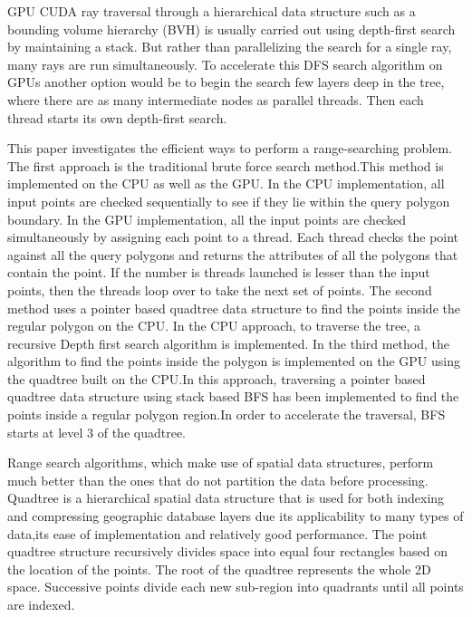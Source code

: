 \documentclass{article}
\begin{document}
GPU CUDA ray traversal through a hierarchical data structure such as a bounding volume hierarchy (BVH) is usually carried out using depth-first search  by maintaining a stack.
But rather than parallelizing the search for a single ray, many rays are run simultaneously.
To accelerate this DFS search algorithm on GPUs another option would be to begin the search few layers deep in the tree, where there are as many intermediate nodes as parallel threads. Then each thread starts its own depth-first search.

This paper investigates the efficient ways to perform a range-searching problem.
The first approach is the traditional brute force search method.This method is implemented on the CPU as well as the GPU. In the CPU implementation, all input points are checked  sequentially to see if they lie within the query polygon boundary. In the GPU implementation, all the input points are checked simultaneously by assigning each point to a thread. Each thread checks the point against all the query polygons and returns the attributes of all the polygons that contain the point. If the number is threads launched is lesser than the input points, then the threads loop over to take the next set of points.
The second method uses a pointer based quadtree data structure to find the points inside the regular polygon on the CPU. In the CPU approach, to traverse the tree, a recursive Depth first search algorithm is implemented.
In the third method, the algorithm to find the points inside the polygon is implemented on the GPU  using the quadtree built on the CPU.In this approach, traversing a pointer based quadtree data structure using stack based BFS has been implemented to find the points inside a regular polygon region.In order to accelerate the traversal, BFS starts at level 3 of the quadtree.

Range search algorithms, which make use of spatial data structures, perform much better than the ones that do not partition the data before processing. Quadtree is a hierarchical spatial data structure that is used for both indexing and compressing geographic database layers due its applicability to many types of data,its ease of implementation and relatively good performance. The point quadtree structure recursively divides space into equal four rectangles based on the location of the points. The root of the quadtree represents the whole 2D space. Successive points divide each new sub-region into quadrants until all points are indexed.
\end{document}
